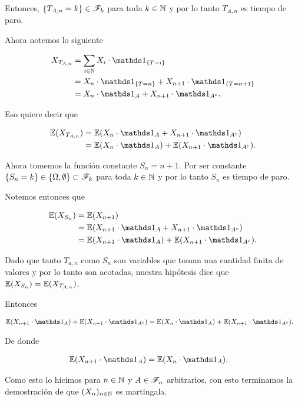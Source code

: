 	Entonces, $\{ T_{A,n} = k\} \in \mathscr{F}_k$ para toda $k \in \mathbb{N}$ y por lo tanto $T_{A,n}$ es tiempo de paro.\pn

    Ahora notemos lo siguiente
    
    \begin{align}
    	X_{T_{A,n}} 	&=		\sum_{i \in \N} X_i \cdot  \indic_{\{T=i\}}						\\
    					&=		X_n \cdot  \indic_{\{T=n\}} + X_{n+1} \cdot  \indic_{\{T=n+1\}}	\\
    					&=		X_n \cdot  \indic_{A} + X_{n+1} \cdot  \indic_{A^c}.
    \end{align}\pn
    
    Eso quiere decir que
    
    \begin{align}
    	\E(X_{T_{A,n}}) 	&=	\E(X_n \cdot  \indic_{A} + X_{n+1} \cdot  \indic_{A^c})		\\
							&=	\E(X_n \cdot  \indic_{A}) + \E(X_{n+1} \cdot  \indic_{A^c}).
    \end{align}\pn
    
    Ahora tomemos la función constante $S_n = n+1$. Por ser constante \\
    $\{S_n = k\} \in \{ \Omega, \emptyset\} \subset \mathscr{F}_k$ para toda $k \in \mathbb{N}$
    y por lo tanto $S_n$ es tiempo de paro.\pn
    
    Notemos entonces que
    
    \begin{align}
    	\E(X_{S_n}) 	&= 		\E(X_{n+1}) 													\\
    					&=		\E(X_{n+1} \cdot \indic_A + X_{n+1} \cdot \indic_{A^c}) 		\\
    					&=		\E(X_{n+1} \cdot \indic_A) +\E( X_{n+1} \cdot \indic_{A^c}). 
    \end{align}
    
    Dado que tanto $T_{a,n}$ como $S_n$ son variables que toman una cantidad finita de valores y por lo tanto son acotadas, 
    nuestra hipótesis dice que \\
    $\mathbb{E}(X_{S_n}) = \mathbb{E}(X_{T_{A,n}})$.\pn
    
    Entonces
    
    \begin{align}
		\E(X_{n+1} \cdot \indic_A) +\E( X_{n+1} \cdot \indic_{A^c}) &=  \E(X_n \cdot  \indic_{A}) + \E(X_{n+1} \cdot  \indic_{A^c}).
    \end{align}\pn
    
    De donde
    
    \begin{align}
			\E(X_{n+1} \cdot \indic_A) &=	\E(X_n \cdot  \indic_{A}).
    \end{align}\pn
    
    Como esto lo hicimos para $n \in \mathbb{N}$ y $A \in \mathscr{F}_n$ arbitrarios, con esto terminamos la demostración de que $(X_n)_{n \in \mathbb{N}}$ es
    martingala.